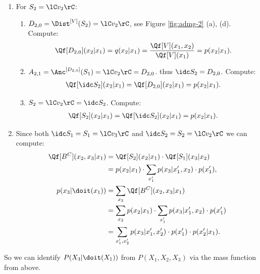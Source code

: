 \begin{Eg}
\begin{enumerate}
\begin{enumerate}
                \item $ S_1 = \lC v_3 \rC = \idc S_1$. Compute:
                    \begin{align*}
                       \Qf[S_1](x_3|x_2) =    \Qf[\idc S_1](x_3|x_2) = \sum_{x_1} p(x_3|x_1,x_2) \cdot p(x_1).
                    \end{align*}
            \end{enumerate}
       \item For $S_2=\lC v_2 \rC$:
            \begin{enumerate}
                \item $D_{2,0} = \Dist^{[V]}(S_2) = \lC v_2 \rC$, see Figure \ref{fig:admg-2} (a), (d). Compute:
                    \begin{align*}
                \Qf[D_{2,0}](x_2|x_1) =  q(x_2|x_1)  = \frac{\Qf[V](x_1,x_2)}{\Qf[V](x_1)}  = p(x_2|x_1).
                    \end{align*}
                \item $A_{2,1} = \Anc^{[D_{2,0}]}(S_1) = \lC v_2  \rC = D_{2,0}$. thus $\idc S_2 = D_{2,0}$. Compute:
                 \begin{align*}
               \Qf[\idc S_2](x_2|x_1)  = \Qf[D_{2,0}](x_2|x_1)  = p(x_2|x_1).
                    \end{align*}
                \item $S_2 = \lC v_2 \rC =\idc S_2$. Compute:
                 \begin{align*}
               \Qf[S_2](x_2|x_1)  = \Qf[\idc S_2](x_2|x_1)  = p(x_2|x_1).
                    \end{align*}
            \end{enumerate}
        \item Since both $\idc S_1 = S_1 = \lC v_3 \rC$ and $\idc S_2 =S_2 = \lC v_2\rC$ we can compute:
               \begin{align*}
                   \Qf[B^C](x_2,x_3|x_1) &= \Qf[S_2](x_2|x_1) \cdot \Qf[S_1](x_3|x_2) \\ 
                                         &= p(x_2|x_1) \cdot \sum_{x_1'} p(x_3|x_1',x_2) \cdot p(x_1'), \\
                   p(x_3|\doit(x_1)) & = \sum_{x_2} \Qf[B^C](x_2,x_3|x_1) \\ 
                   & = \sum_{x_2} p(x_2|x_1) \cdot \sum_{x_1'} p(x_3|x_1',x_2) \cdot p(x_1') \\
                   & = \sum_{x_1',x_2'} p(x_3|x_1',x_2') \cdot p(x_1') \cdot p(x_2'|x_1).   
               \end{align*}
    \end{enumerate}
    So we can identify $P(X_3|\doit(X_1))$ from $P(X_1,X_2,X_3)$ via the mass function from above.
\end{Eg}









